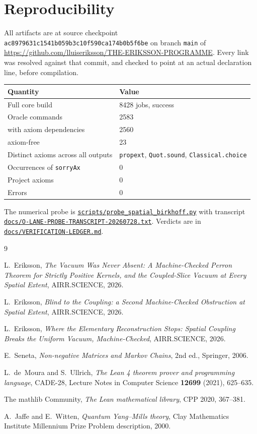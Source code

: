 \documentclass[11pt]{article}
\theoremstyle{definition}
\newcommand{\anchor}{ac8979631c1541b059b3c10f590ca174b0b5f6be}
\newcommand{\repofile}[2]{%
  \href{https://github.com/lluiseriksson/THE-ERIKSSON-PROGRAMME/blob/\anchor/#1}{\nolinkurl{#2}}}
\begin{document}
\section{Reproducibility}\label{sec:repro}

All artifacts are at source checkpoint \texttt{\anchor} on branch \texttt{main}
of \url{https://github.com/lluiseriksson/THE-ERIKSSON-PROGRAMME}.  Every link
was resolved against that commit, and checked to point at an actual declaration
line, before compilation.

\begin{center}
\begin{tabular}{ll}
\toprule
Quantity & Value \\
\midrule
Full core build & 8428 jobs, success \\
Oracle commands & 2583 \\
\quad with axiom dependencies & 2560 \\
\quad axiom-free & 23 \\
Distinct axioms across all outputs & \texttt{propext}, \texttt{Quot.sound}, \texttt{Classical.choice} \\
Occurrences of \texttt{sorryAx} & 0 \\
Project axioms & 0 \\
Errors & 0 \\
\bottomrule
\end{tabular}
\end{center}

The numerical probe is
\repofile{scripts/probe\_spatial\_birkhoff.py}{scripts/probe\_spatial\_birkhoff.py}
with transcript
\repofile{docs/O-LANE-PROBE-TRANSCRIPT-20260728.txt}{docs/O-LANE-PROBE-TRANSCRIPT-20260728.txt}.
Verdicts are in
\repofile{docs/VERIFICATION-LEDGER.md}{docs/VERIFICATION-LEDGER.md}.

\begin{thebibliography}{9}

L.~Eriksson,
\emph{The Vacuum Was Never Absent: A Machine-Checked Perron Theorem for Strictly
Positive Kernels, and the Coupled-Slice Vacuum at Every Spatial Extent}, AIRR.SCIENCE, 2026.

L.~Eriksson,
\emph{Blind to the Coupling: a Second Machine-Checked Obstruction at Spatial
Extent}, AIRR.SCIENCE, 2026.

L.~Eriksson,
\emph{Where the Elementary Reconstruction Stops: Spatial Coupling Breaks the
Uniform Vacuum, Machine-Checked}, AIRR.SCIENCE, 2026.

E.~Seneta,
\emph{Non-negative Matrices and Markov Chains},
2nd ed., Springer, 2006.

L.~de~Moura and S.~Ullrich,
\emph{The Lean 4 theorem prover and programming language},
CADE-28, Lecture Notes in Computer Science \textbf{12699} (2021), 625--635.

The mathlib Community,
\emph{The Lean mathematical library},
CPP 2020, 367--381.

A.~Jaffe and E.~Witten,
\emph{Quantum Yang--Mills theory},
Clay Mathematics Institute Millennium Prize Problem description, 2000.

\end{thebibliography}
\end{document}

